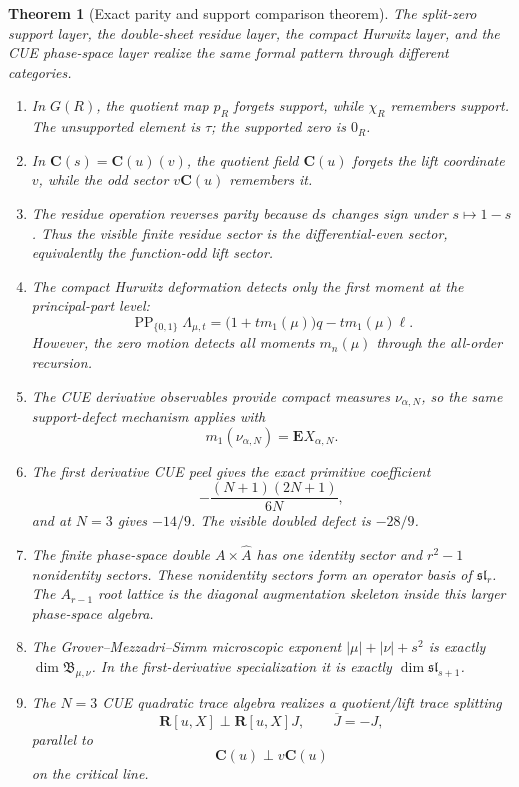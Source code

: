 \documentclass[11pt]{article}
\newcommand{\C}{\mathbf C}
\newcommand{\R}{\mathbf R}
\newcommand{\PP}{\operatorname{PP}}
\theoremstyle{plain}
\newtheorem{theorem}{Theorem}[section]
\theoremstyle{definition}
\begin{document}
\begin{theorem}[Exact parity and support comparison theorem]\label{thm:dictionary}
The split-zero support layer, the double-sheet residue layer, the compact Hurwitz layer, and the CUE phase-space layer realize the same formal pattern through different categories.
\begin{enumerate}[label=\textup{(\arabic*)}]
\item In \(G(R)\), the quotient map \(p_R\) forgets support, while \(\chi_R\) remembers support.  The unsupported element is \(\tau\); the supported zero is \(0_R\).
\item In \(\C(s)=\C(u)(v)\), the quotient field \(\C(u)\) forgets the lift coordinate \(v\), while the odd sector \(v\C(u)\) remembers it.
\item The residue operation reverses parity because \(ds\) changes sign under \(s\mapsto1-s\).  Thus the visible finite residue sector is the differential-even sector, equivalently the function-odd lift sector.
\item The compact Hurwitz deformation detects only the first moment at the principal-part level:
\[
   \PP_{\{0,1\}}\Lambda_{\mu,t}
   =\bigl(1+tm_1(\mu)\bigr)q-tm_1(\mu)\ell.
\]
However, the zero motion detects all moments \(m_n(\mu)\) through the all-order recursion.
\item The CUE derivative observables provide compact measures \(\nu_{\alpha,N}\), so the same support-defect mechanism applies with
\[
   m_1(\nu_{\alpha,N})=\mathbf E X_{\alpha,N}.
\]
\item The first derivative CUE peel gives the exact primitive coefficient
\[
   -\frac{(N+1)(2N+1)}{6N},
\]
and at \(N=3\) gives \(-14/9\).  The visible doubled defect is \(-28/9\).
\item The finite phase-space double \(A\times\widehat A\) has one identity sector and \(r^2-1\) nonidentity sectors.  These nonidentity sectors form an operator basis of \(\mathfrak{sl}_r\).  The \(A_{r-1}\) root lattice is the diagonal augmentation skeleton inside this larger phase-space algebra.
\item The Grover--Mezzadri--Simm microscopic exponent \(|\mu|+|\nu|+s^2\) is exactly \(\dim\mathfrak B_{\mu,\nu}\).  In the first-derivative specialization it is exactly \(\dim\mathfrak{sl}_{s+1}\).
\item The \(N=3\) CUE quadratic trace algebra realizes a quotient/lift trace splitting
\[
   \R[u,X]\perp \R[u,X]J,
   \qquad
   \overline J=-J,
\]
parallel to
\[
   \C(u)\perp v\C(u)
\]
on the critical line.
\end{enumerate}
\end{theorem}
\end{document}
